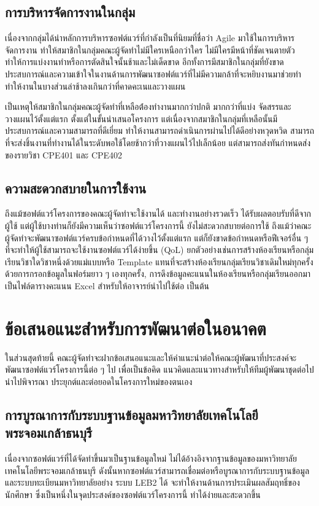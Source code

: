 \documentclass[12pt,one side,openright,a4paper]{cpe-thesis-th}
\newcommand{\thaijustify}[1]{%
  \par\hspace{30pt}\justifying
  #1
}
\begin{document}
\subsection{การบริหารจัดการงานในกลุ่ม}
\thaijustify{
  เนื่องจากกลุ่มได้นำหลักการบริหารซอฟต์แวร์ที่กำลังเป็นที่นิยมที่ชื่อว่า Agile มาใช้ในการบริหารจัดการงาน ทำให้สมาชิกในกลุ่มคณะผู้จัดทำไม่มีใครเหนือกว่าใคร ไม่มีใครมีหน้าที่ชัดเจนตายตัว ทำให้การแบ่งงานทำหรือการตัดสินใจนั้นช้าและไม่เด็ดขาด อีกทั้งการมีสมาชิกในกลุ่มที่ยังขาดประสบการณ์และความเข้าใจในงานด้านการพัฒนาซอฟต์แวร์ที่ไม่มีความกล้าที่จะหยิบงานมาช่วยทำ ทำให้งานในบางส่วนล่าช้าลงเกินกว่าที่คาดคะเนและวางแผน
}
\thaijustify{
  เป็นเหตุให้สมาชิกในกลุ่มคณะผู้จัดทำที่เหลือต้่องทำงานมากกว่าปกติ มากกว่าที่แบ่ง จัดสรรและวางแผนไว้ตั้งแต่แรก ตั้งแต่ในขั้นนำเสนอโครงการ แต่เนื่องจากสมาชิกในกลุ่มที่เหลือนั้นมีประสบการณ์และความสามารถที่ดีเยี่ยม ทำให้งานสามารถดำเนินการผ่านไปได้ดีอย่างหวุดหวิด สามารถที่จะส่งชิ้นงานที่ทำงานได้ในระดับพอใช้โดยช้ากว่าที่วางแผนไว้ไปเล็กน้อย แต่สามารถส่งทันกำหนดส่งของรายวิชา CPE401 และ CPE402
}
\subsection{ความสะดวกสบายในการใช้งาน}
\thaijustify{
  ถึงแม้ซอฟต์แวร์โครงการของคณะผู้จัดทำจะใช้งานได้ และทำงานอย่างรวดเร็ว ได้รับผลตอบรับที่ดีจากผู้ใช้ แต่ผู้ใช้บางท่านก็ยังมีความเห็นว่าซอฟต์แวร์โครงการนี้ ยังไม่สะดวกสบายต่อการใช้ ถึงแม้ว่าคณะผู้จัดทำจะพัฒนาซอฟต์แวร์ครบข้อกำหนดที่ได้วางไว้ตั้งแต่แรก แต่ก็ยังขาดข้อกำหนดหรือฟีเจอร์อื่น ๆ ที่จะทำให้ผู้ใช้สามารถจะใช้งานซอฟต์แวร์ได้ง่ายขึ้น (QoL) ยกตัวอย่างเช่นการสร้างห้องเรียนหรือกลุ่มเรียนวิชาใดวิชาหนึ่งด้วยแม่แบบหรือ Template แทนที่จะสร้างห้องเรียนกลุ่มเรียนวิชาเดิมใหม่ทุกครั้งด้วยการกรอกข้อมูลในฟอร์มยาว ๆ เองทุกครั้ง, การดึงข้อมูลคะแนนในห้องเรียนหรือกลุ่มเรียนออกมาเป็นไฟล์ตารางคะแนน Excel สำหรับให้อาจารย์นำไปใช้ต่อ เป็นต้น
}
\section{ข้อเสนอแนะสำหรับการพัฒนาต่อในอนาคต}
ในส่วนสุดท้ายนี้ คณะผู้จัดทำจะฝากข้อเสนอแนะและให้คำแนะนำต่อให้คณะผู้พัฒนาที่ประสงค์จะพัฒนาซอฟต์แวร์โครงการนี้ต่อ ๆ ไป เพื่อเป็นข้อคิด แนวคิดและแนวทางสำหรับให้ทีมผู้พัฒนาชุดต่อไปนำไปพิจารณา ประยุกต์และต่อยอดในโครงการใหม่ของตนเอง
\subsection{การบูรณาการกับระบบฐานข้อมูลมหาวิทยาลัยเทคโนโลยีพระจอมเกล้าธนบุรี}
\thaijustify{
  เนื่องจากซอฟต์แวร์ที่ได้จัดทำขึ้นมาเป็นฐานข้อมูลใหม่ ไม่ได้อ้างอิงจากฐานข้อมูลของมหาวิทยาลัยเทคโนโลยีพระจอมเกล้าธนบุรี ดังนั้นหากซอฟต์แวร์สามารถเชื่อมต่อหรือบูรณาการกับระบบฐานข้อมูลและระบบทะเบียนมหาวิทยาลัยอย่าง ระบบ LEB2 ได้ จะทำให้งานด้านการประเมินผลสัมฤทธิ์ของนักศึกษา ซึ่งเป็นหนึ่งในจุดประสงค์ของซอฟต์แวร์โครงการนี้ ทำได้ง่ายและสะดวกขึ้น
}
\end{document}
